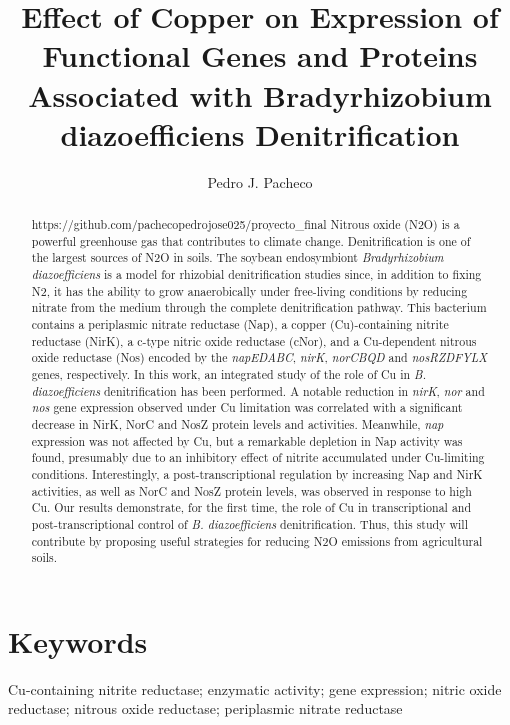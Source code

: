 \documentclass[12pt]{article}
\title{\textbf{Effect of Copper on Expression of Functional Genes
and Proteins Associated with Bradyrhizobium
diazoefficiens Denitrification}}
\author{Pedro J. Pacheco}
\date{}
\begin{document}
\maketitle
\begin{abstract}
https://github.com/pachecopedrojose025/proyecto_final
Nitrous oxide (N2O) is a powerful greenhouse gas that contributes to climate change.
Denitrification is one of the largest sources of N2O in soils. The soybean endosymbiont {\em Bradyrhizobium
diazoefficiens} is a model for rhizobial denitrification studies since, in addition to fixing N2, it has
the ability to grow anaerobically under free-living conditions by reducing nitrate from the medium
through the complete denitrification pathway. This bacterium contains a periplasmic nitrate reductase
(Nap), a copper (Cu)-containing nitrite reductase (NirK), a c-type nitric oxide reductase (cNor), and
a Cu-dependent nitrous oxide reductase (Nos) encoded by the {\em napEDABC}, {\em nirK}, {\em norCBQD} and
{\em nosRZDFYLX} genes, respectively. In this work, an integrated study of the role of Cu in {\em B. diazoefficiens}
denitrification has been performed. A notable reduction in {\em nirK}, {\em nor} and {\em nos} gene expression observed
under Cu limitation was correlated with a significant decrease in NirK, NorC and NosZ protein levels
and activities. Meanwhile, {\em nap} expression was not affected by Cu, but a remarkable depletion in Nap
activity was found, presumably due to an inhibitory effect of nitrite accumulated under Cu-limiting
conditions. Interestingly, a post-transcriptional regulation by increasing Nap and NirK activities, as
well as NorC and NosZ protein levels, was observed in response to high Cu. Our results demonstrate,
for the first time, the role of Cu in transcriptional and post-transcriptional control of {\em B. diazoefficiens}
denitrification. Thus, this study will contribute by proposing useful strategies for reducing N2O
emissions from agricultural soils.
\end{abstract}

\section*{Keywords}
Cu-containing nitrite reductase; enzymatic activity; gene expression; nitric oxide
reductase; nitrous oxide reductase; periplasmic nitrate reductase
\end{document}
